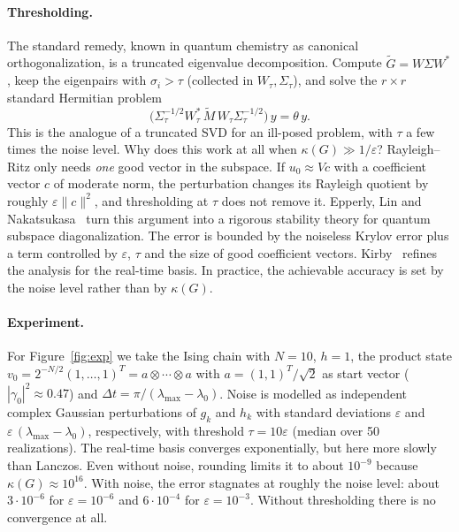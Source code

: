 \documentclass[11pt,a4paper]{article}
\begin{document}
\paragraph{Thresholding.} The standard remedy, known in quantum
chemistry as canonical orthogonalization, is a truncated eigenvalue
decomposition. Compute
$\widetilde G = W\Sigma W^*$, keep the eigenpairs with $\sigma_i>\tau$
(collected in $W_\tau,\Sigma_\tau$), and solve the $r\times r$ standard
Hermitian problem
\begin{equation}\label{eq:thresh}
  \big(\Sigma_\tau^{-1/2}W_\tau^*\,\widetilde M\,W_\tau\Sigma_\tau^{-1/2}\big)\,y = \theta\, y .
\end{equation}
This is the analogue of a truncated SVD for an ill-posed problem, with
$\tau$ a few times the noise level. Why does this work at all when
$\kappa(G)\gg 1/\varepsilon$? Rayleigh--Ritz only needs \emph{one}
good vector in the subspace. If $u_0\approx Vc$ with a coefficient
vector $c$ of moderate norm, the perturbation changes its Rayleigh
quotient by roughly $\varepsilon\|c\|^2$, and thresholding at $\tau$ does
not remove it. Epperly, Lin and Nakatsukasa~\cite{ELN22} turn this argument into a
rigorous stability theory for quantum subspace diagonalization. The
error is bounded by the noiseless Krylov error plus a term controlled by
$\varepsilon$, $\tau$ and the size of good coefficient vectors.
Kirby~\cite{Kirby24} refines the analysis for the real-time basis. In practice, the
achievable accuracy is set by the noise level rather than by $\kappa(G)$.

\paragraph{Experiment.} For Figure~\ref{fig:exp} we take the Ising chain with
$N=10$, $h=1$, the product state $v_0 = 2^{-N/2}(1,\dots,1)^T=a\otimes\cdots\otimes a$
with $a=(1,1)^T/\sqrt2$ as start vector ($|\gamma_0|^2\approx0.47$) and
$\Delta t = \pi/(\lambda_{\max}-\lambda_0)$. Noise is modelled as
independent complex Gaussian perturbations of $g_k$ and $h_k$ with
standard deviations $\varepsilon$ and $\varepsilon\,(\lambda_{\max}-\lambda_0)$,
respectively, with
threshold $\tau=10\varepsilon$ (median over 50 realizations). The
real-time basis converges exponentially, but here more slowly than Lanczos.
Even without noise, rounding limits it to about $10^{-9}$ because
$\kappa(G)\approx10^{16}$. With noise, the error stagnates at roughly
the noise level: about $3\cdot10^{-6}$ for $\varepsilon=10^{-6}$ and
$6\cdot 10^{-4}$ for $\varepsilon=10^{-3}$. Without thresholding there is no
convergence at all.
\end{document}
